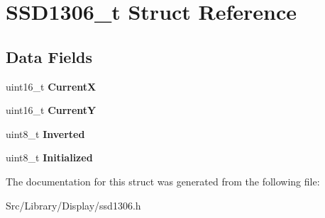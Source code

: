 \hypertarget{struct_s_s_d1306__t}{}\section{S\+S\+D1306\+\_\+t Struct Reference}
\label{struct_s_s_d1306__t}
\subsection*{Data Fields}
\begin{DoxyCompactItemize}
\item 
\mbox{\label{struct_s_s_d1306__t_a2c40063b7f8a6faf0cb91f191070e87a}} 
uint16\+\_\+t {\bfseries CurrentX}
\item 
\mbox{\label{struct_s_s_d1306__t_a231012af7d06a1e4395368f8b688e7d3}} 
uint16\+\_\+t {\bfseries CurrentY}
\item 
\mbox{\label{struct_s_s_d1306__t_a1332809f31ef3c465321a19262e75d71}} 
uint8\+\_\+t {\bfseries Inverted}
\item 
\mbox{\label{struct_s_s_d1306__t_a5ced8054f4e1bd14884d253d81449cf2}} 
uint8\+\_\+t {\bfseries Initialized}
\end{DoxyCompactItemize}


The documentation for this struct was generated from the following file\+:\begin{DoxyCompactItemize}
\item 
Src/\+Library/\+Display/ssd1306.\+h\end{DoxyCompactItemize}
